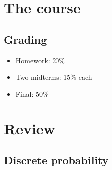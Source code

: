 \chapter*{The course} \label{chp:course}

\section*{Grading} \label{sec:grading}
\begin{itemize}
    \item Homework: 20\%
    \item Two midterms: 15\% each
    \item Final: 50\%
\end{itemize}

\chapter{Review} \label{chp:review}

\section{Discrete probability} \label{sec:discrete}

